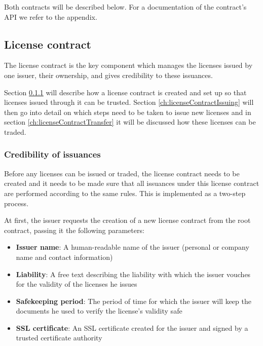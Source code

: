\documentclass[a4paper]{article}
\begin{document}
Both contracts will be described below. For a documentation of the contract's API we refer to the appendix.





\subsection{License contract}
The license contract is the key component which manages the licenses issued by one issuer, their ownership, and gives credibility to these issuances. 

Section \ref{ch:licenseContractCredibility} will describe how a license contract is created and set up so that licenses issued through it can be trusted. Section \ref{ch:licenseContractIssuing} will then go into detail on which steps need to be taken to issue new licenses and in section \ref{ch:licenseContractTransfer} it will be discussed how these licenses can be traded. 





\subsubsection{Credibility of issuances}
\label{ch:licenseContractCredibility}

Before any licenses can be issued or traded, the license contract needs to be created and it needs to be made sure that all issuances under this license contract are performed according to the same rules. This is implemented as a two-step process.

At first, the issuer requests the creation of a new license contract from the root contract, passing it the following parameters:

\begin{itemize}
  \item \textbf{Issuer name}: A human-readable name of the issuer (personal or company name and contact information)
  \item \textbf{Liability}: A free text describing the liability with which the issuer vouches for the validity of the licenses he issues
  \item \textbf{Safekeeping period}: The period of time for which the issuer will keep the documents he used to verify the license's validity safe
  \item \textbf{SSL certificate}: An SSL certificate created for the issuer and signed by a trusted certificate authority
\end{itemize}
\end{document}

